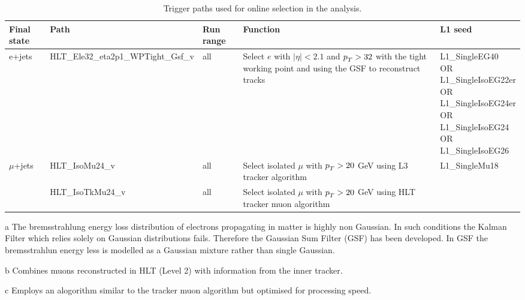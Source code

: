 \begin{table}[htp]
\centering
\caption{Trigger paths used for online selection in the analysis.}
\label{tab:triggers}
\begin{threeparttable}
\begin{tabular}{lllm{4cm}l}\hline
Final state                 & Path                                & Run range & Function & L1 seed\\\hline
e+jets                      & HLT\_Ele32\_eta2p1\_WPTight\_Gsf\_v & all       & \small Select $e$ with $\left|\eta\right|<2.1$ and $p_{T}^{}>32$ with the tight working point and using the GSF\tnote{a} to reconstruct tracks
                                                                                         & \small\makecell{ L1\_SingleEG40\\OR\\L1\_SingleIsoEG22er\\OR\\L1\_SingleIsoEG24er\\OR\\L1\_SingleIsoEG24\\OR\\L1\_SingleIsoEG26}\\\hline
\multirow{2}{*}{$\mu$+jets}
                            & HLT\_IsoMu24\_v                     & all       & \small Select isolated $\mu$ with $p_{T}^{}>20$ GeV using L3 tracker algorithm\tnote{b}         & \multirow{2}{*}{\small L1\_SingleMu18}\\
                            & HLT\_IsoTkMu24\_v                   & all       & \small Select isolated $\mu$ with $p_{T}^{}>20$ GeV using HLT tracker muon algorithm\tnote{c}
                            & \\\hline
\end{tabular}
\footnotesize
\begin{tablenotes}
\item[a] The bremsstrahlung energy loss distribution of electrons propagating in matter is highly non Gaussian. In such conditions the Kalman Filter which relies solely on Gaussian distributions fails. Therefore the Gaussian Sum Filter (GSF) \cite{Adam:2003kg} has been developed. In GSF the bremsstrahlun energy less is modelled as a Gaussian mixture rather than single Gaussian.
\item[b] Combines muons reconstructed in HLT (Level 2) with information from the inner tracker.
\item[c] Employs an alogorithm similar to the tracker muon algorithm but optimised for processing speed.
\end{tablenotes}
\end{threeparttable}

\end{table}

